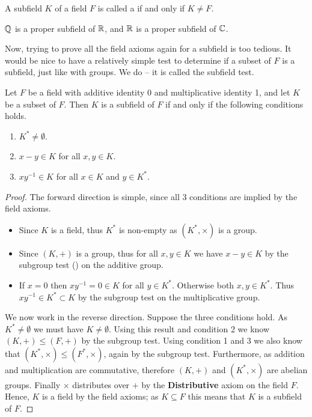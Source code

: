 \begin{definition}
    A subfield $K$ of a field $F$ is called a  if and only if $K \neq F$.
\end{definition}

\begin{example}
    $\mathbb{Q}$ is a proper subfield of $\mathbb{R}$, and $\mathbb{R}$ is a proper subfield of $\mathbb{C}$.
\end{example}

Now, trying to prove all the field axioms again for a subfield is too tedious. It would be nice to have a relatively simple test to determine if a subset of $F$ is a subfield, just like with groups. We do -- it is called the subfield test.

\begin{theorem}\label{thrm-subfield-test}
    Let $F$ be a field with additive identity 0 and multiplicative identity 1, and let $K$ be a subset of $F$. Then $K$ is a subfield of $F$ if and only if the following conditions holds.
    \begin{enumerate}
        \item $K^\ast \neq \emptyset$.
        \item $x - y \in K$ for all $x, y \in K$.
        \item $xy^{-1} \in K$ for all $x \in K$ and $y \in K^\ast$.
    \end{enumerate}
\end{theorem}
\begin{proof}
    The forward direction is simple, since all 3 conditions are implied by the field axioms.
    \begin{itemize}
        \item Since $K$ is a field, thus $K^\ast$ is non-empty as $(K^\ast, \times)$ is a group.
        \item Since $(K, +)$ is a group, thus for all $x, y \in K$ we have $x - y \in K$ by the subgroup test () on the additive group.
        \item If $x = 0$ then $xy^{-1} = 0 \in K$ for all $y \in K^\ast$. Otherwise both $x, y \in K^\ast$. Thus $xy^{-1} \in K^\ast \subset K$ by the subgroup test on the multiplicative group.
    \end{itemize}

    We now work in the reverse direction. Suppose the three conditions hold. As $K^\ast \neq \emptyset$ we must have $K \neq \emptyset$. Using this result and condition 2 we know $(K, +) \leq (F, +)$ by the subgroup test. Using condition 1 and 3 we also know that $(K^\ast, \times) \leq (F^\ast, \times)$, again by the subgroup test. Furthermore, as addition and multiplication are commutative, therefore $(K, +)$ and $(K^\ast, \times)$ are abelian groups. Finally $\times$ distributes over $+$ by the \textbf{Distributive} axiom on the field $F$. Hence, $K$ is a field by the field axioms; as $K \subseteq F$ this means that $K$ is a subfield of $F$.
\end{proof}

